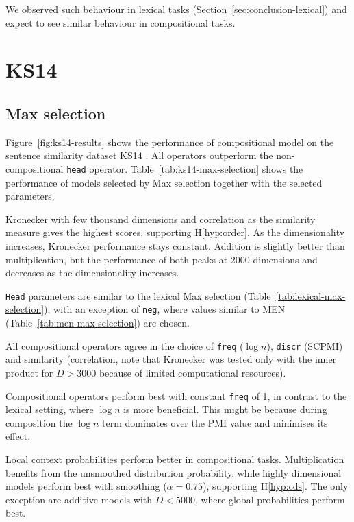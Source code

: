 We observed such behaviour in lexical tasks (Section~\ref{sec:conclusion-lexical}) and expect to see similar behaviour in compositional tasks.

\section{KS14}
\label{sec:ks14}

\subsection{Max selection}
\label{sec:max-selection-ks14}



Figure~\ref{fig:ks14-results} shows the performance of compositional model on the sentence similarity dataset KS14 \cite{kartsadrqpl2014}. All operators outperform the non-compositional \texttt{head} operator. Table~\ref{tab:ks14-max-selection} shows the performance of models selected by Max selection together with the selected parameters.

Kronecker with few thousand dimensions and correlation as the similarity measure gives the highest scores, supporting H\ref{hyp:order}. As the dimensionality increases, Kronecker performance stays constant. Addition is slightly better than multiplication, but the performance of both peaks at 2000 dimensions and decreases as the dimensionality increases.

\texttt{Head} parameters are similar to the lexical Max selection (Table~\ref{tab:lexical-max-selection}), with an exception of \texttt{neg}, where values similar to MEN (Table~\ref{tab:men-max-selection}) are chosen.

All compositional operators agree in the choice of \texttt{freq} ($\log n$), \texttt{discr} (SCPMI) and similarity (correlation, note that Kronecker was tested only with the inner product for $D > 3000$ because of limited computational resources).

Compositional operators perform best with constant \texttt{freq} of 1, in contrast to the lexical setting, where $\log n$ is more beneficial. This might be because during composition the $\log n$ term dominates over the PMI value and minimises its effect.

Local context probabilities perform better in compositional tasks. Multiplication benefits from the unsmoothed distribution probability, while highly dimensional models perform best with smoothing ($\alpha = 0.75$), supporting H\ref{hyp:cds}. The only exception are additive models with $D < 5000$, where global probabilities perform best.

